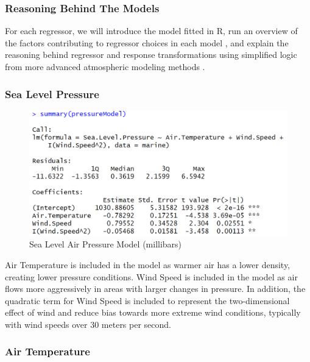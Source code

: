 \documentclass{article}
\begin{document}
\subsubsection{Reasoning Behind The Models}

For each regressor, we will introduce the model fitted in R, run an overview of the factors contributing to regressor choices in each model \cite{bowditch-2017}, and explain the reasoning behind regressor and response transformations using simplified logic from more advanced atmospheric modeling methods \cite{Jacobson2005-bd}.

\subsubsection*{Sea Level Pressure}

\begin{figure}[h]
    \centering
    \includegraphics[scale = 0.6]{code snippets/summaryPressure.PNG}
    \caption{Sea Level Air Pressure Model (millibars)}
    \label{fig:PressureModel}
\end{figure}

Air Temperature is included in the model as warmer air has a lower density, creating lower pressure conditions. Wind Speed is included in the model as air flows more aggressively in areas with larger changes in pressure. In addition, the quadratic term for Wind Speed is included to represent the two-dimensional effect of wind and reduce bias towards more extreme wind conditions, typically with wind speeds over 30 meters per second.

\subsubsection*{Air Temperature}
\end{document}
